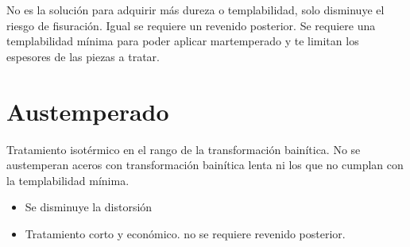 \documentclass{article}
\begin{document}
No es la solución para adquirir más dureza o templabilidad, solo disminuye el riesgo de fisuración. Igual se requiere un revenido posterior. Se requiere una templabilidad mínima para poder aplicar martemperado y te limitan los espesores de las piezas a tratar.

\section{Austemperado}

Tratamiento isotérmico en el rango de la transformación bainítica. No se austemperan aceros con transformación bainítica lenta ni los que no cumplan con la templabilidad mínima.
\begin{itemize}
    \item Se disminuye la distorsión
    \item Tratamiento corto y económico. no se requiere revenido posterior.
\end{itemize}


\end{document}
